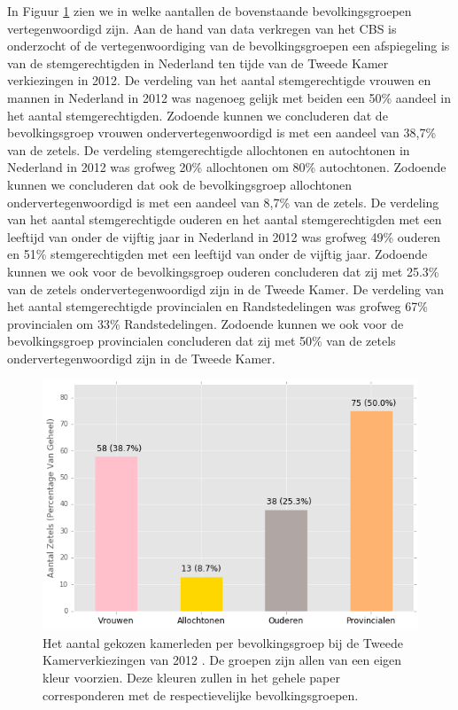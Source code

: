 In Figuur \ref{fig:az2012} zien we in welke aantallen de bovenstaande bevolkingsgroepen vertegenwoordigd zijn. Aan de hand van data verkregen van het CBS \citeyearpar{CBS_stemgedrag} is onderzocht of de vertegenwoordiging van de bevolkingsgroepen een afspiegeling is van de stemgerechtigden in Nederland ten tijde van de Tweede Kamer verkiezingen in 2012.
De verdeling van het aantal stemgerechtigde vrouwen en mannen in Nederland in 2012 was nagenoeg gelijk met beiden een 50\% aandeel in het aantal stemgerechtigden. Zodoende kunnen we concluderen dat de bevolkingsgroep vrouwen ondervertegenwoordigd is met een aandeel van 38,7\% van de zetels. 
De verdeling stemgerechtigde allochtonen en autochtonen in Nederland in 2012 was grofweg 20\% allochtonen om 80\% autochtonen. Zodoende kunnen we concluderen dat ook de bevolkingsgroep allochtonen ondervertegenwoordigd is met een aandeel van 8,7\% van de zetels. 
De verdeling van het aantal stemgerechtigde ouderen en het aantal stemgerechtigden met een leeftijd van onder de vijftig jaar in Nederland in 2012 was grofweg 49\% ouderen en 51\% stemgerechtigden met een leeftijd van onder de vijftig jaar. Zodoende kunnen we ook voor de bevolkingsgroep ouderen concluderen dat zij met 25.3\% van de zetels ondervertegenwoordigd zijn in de Tweede Kamer. 
De verdeling van het aantal stemgerechtigde provincialen en Randstedelingen was grofweg 67\% provincialen om 33\% Randstedelingen. Zodoende kunnen we ook voor de bevolkingsgroep provincialen concluderen dat zij met 50\% van de zetels ondervertegenwoordigd zijn in de Tweede Kamer. 

\begin{figure}[H]
\centering

	\includegraphics[width=0.55\linewidth]{aantal_zetels_bevolkingsgroepen.png}

			\caption{Het aantal gekozen kamerleden per bevolkingsgroep bij de Tweede Kamerverkiezingen van 2012 \citep{Kiesraad_uitslag}. De groepen zijn allen van een eigen kleur voorzien. Deze kleuren zullen in het gehele paper corresponderen met de respectievelijke bevolkingsgroepen.}

\label{fig:az2012}
\end{figure}

